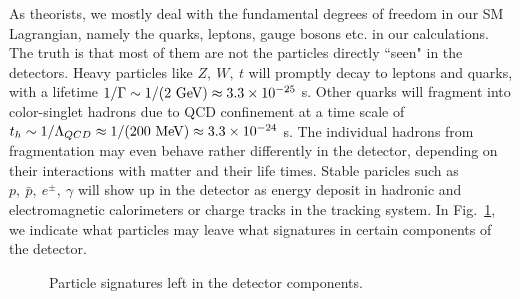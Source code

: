 \documentclass[prd,aps,floats,preprintnumbers,preprint,superscriptaddress,floatfix,nofootinbib]{revtex4}
\def\mev{{\rm MeV}}
\def\gev{{\rm GeV}}
\begin{document}
As theorists, we  mostly deal with the fundamental degrees of freedom 
in our SM Lagrangian, 
namely the quarks, leptons, gauge bosons etc. in our calculations.
 The truth is that most of them  are not  the particles
directly ``seen" in the detectors.  Heavy particles like $Z,\ W,\ t$ 
will promptly decay to leptons and quarks, with a lifetime
$1/\Gamma \sim 1/(2\ \gev) \approx 3.3\times 10^{-25}$ s.
Other quarks will fragment into color-singlet hadrons due to 
QCD confinement at a time scale of 
$t_h\sim 1/\Lambda_{QCD} \approx 1/(200\ \mev)\approx 3.3\times10^{-24}$ s.
The individual hadrons from fragmentation may even behave
rather differently in the detector, depending on their interactions with
matter and their life times. 
Stable paricles such as $p,\ \bar p,\ e^\pm,\ \gamma$  will
show up in the detector as energy deposit in hadronic and electromagnetic
calorimeters or charge tracks in the tracking system.
In Fig.~\ref{fig:showup},  we indicate what particles may leave 
what signatures in certain components of the detector.

\begin{center}
\begin{figure}[tb]
\caption{Particle signatures left in the detector components.
\label{fig:showup}}
\end{figure}
\end{center}
\end{document}
